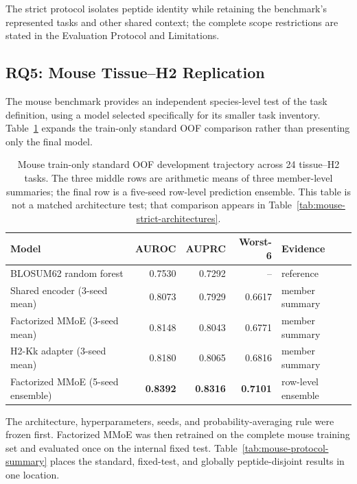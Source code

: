 The strict protocol isolates peptide identity while retaining the benchmark's represented tasks and other shared context; the complete scope restrictions are stated in the Evaluation Protocol and Limitations.

\subsection{RQ5: Mouse Tissue--H2 Replication}

The mouse benchmark provides an independent species-level test of the task definition, using a model selected specifically for its smaller task inventory. Table~\ref{tab:mouse-baselines} expands the train-only standard OOF comparison rather than presenting only the final model.

\begin{table}[tbp]
\centering
\caption{Mouse train-only standard OOF development trajectory across 24 tissue--H2 tasks. The three middle rows are arithmetic means of three member-level summaries; the final row is a five-seed row-level prediction ensemble. This table is not a matched architecture test; that comparison appears in Table~\ref{tab:mouse-strict-architectures}.}
\label{tab:mouse-baselines}
\footnotesize
\setlength{\tabcolsep}{3pt}
\begin{tabular}{lrrrl}
\toprule
Model & AUROC & AUPRC & Worst-6 & Evidence \\ 
\midrule
BLOSUM62 random forest & 0.7530 & 0.7292 & -- & reference \\ 
Shared encoder (3-seed mean) & 0.8073 & 0.7929 & 0.6617 & member summary \\ 
Factorized MMoE (3-seed mean) & 0.8148 & 0.8043 & 0.6771 & member summary \\ 
H2-Kk adapter (3-seed mean) & 0.8180 & 0.8065 & 0.6816 & member summary \\ 
Factorized MMoE (5-seed ensemble) & \textbf{0.8392} & \textbf{0.8316} & \textbf{0.7101} & row-level ensemble \\ 
\bottomrule
\end{tabular}
\end{table}

The architecture, hyperparameters, seeds, and probability-averaging rule were frozen first. Factorized MMoE was then retrained on the complete mouse training set and evaluated once on the internal fixed test. Table~\ref{tab:mouse-protocol-summary} places the standard, fixed-test, and globally peptide-disjoint results in one location.

